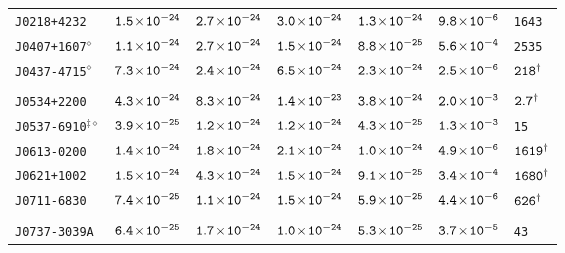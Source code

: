 \begin{longtable}{l | c | c | c | c | c | l}
\scriptsize{\tt{J0218+4232}} & \scriptsize{$\tt{1.5\!\times\!10^{-24}}$} & \scriptsize{$\tt{2.7\!\times\!10^{-24}}$} & \scriptsize{$\tt{3.0\!\times\!10^{-24}}$} &\scriptsize{$\tt{1.3\!\times\!10^{-24}}$} & \scriptsize{$\tt{9.8\!\times\!10^{-6}}$} & \scriptsize{\tt{1643}} \\[-16pt] 
\scriptsize{\tt{J0407+1607}$^{\diamond}$} & \scriptsize{$\tt{1.1\!\times\!10^{-24}}$} &
\scriptsize{$\tt{2.7\!\times\!10^{-24}}$} & \scriptsize{$\tt{1.5\!\times\!10^{-24}}$} &\scriptsize{$\tt{8.8\!\times\!10^{-25}}$} &
\scriptsize{$\tt{5.6\!\times\!10^{-4}}$} & \scriptsize{\tt{2535}} \\[-16pt] 
\scriptsize{\tt{J0437-4715}$^{\diamond}$} & \scriptsize{$\tt{7.3\!\times\!10^{-24}}$} &
\scriptsize{$\tt{2.4\!\times\!10^{-24}}$} & \scriptsize{$\tt{6.5\!\times\!10^{-24}}$} & \scriptsize{$\tt{2.3\!\times\!10^{-24}}$}
& \scriptsize{$\tt{2.5\!\times\!10^{-6}}$} & \scriptsize{$\tt{218^{\dagger}}$} \\[-16pt] 
\\[-20pt] 
\scriptsize{\tt{J0534+2200}} & \scriptsize{$\tt{4.3\!\times\!10^{-24}}$} & \scriptsize{$\tt{8.3\!\times\!10^{-24}}$} & \scriptsize{$\tt{1.4\!\times\!10^{-23}}$} & \scriptsize{$\tt{3.8\!\times\!10^{-24}}$} & \scriptsize{$\tt{2.0\!\times\!10^{-3}}$} & \scriptsize{$\tt{2.7^{\dagger}}$} \\[-16pt] 
\scriptsize{\tt{J0537-6910}$^{\ddagger\diamond}$} & \scriptsize{$\tt{3.9\!\times\!10^{-25}}$} &
\scriptsize{$\tt{1.2\!\times\!10^{-24}}$} & \scriptsize{$\tt{1.2\!\times\!10^{-24}}$} &\scriptsize{$\tt{4.3\!\times\!10^{-25}}$} &
\scriptsize{$\tt{1.3\!\times\!10^{-3}}$} & \scriptsize{\tt{15}} \\[-16pt] 
\scriptsize{\tt{J0613-0200}} & \scriptsize{$\tt{1.4\!\times\!10^{-24}}$} & \scriptsize{$\tt{1.8\!\times\!10^{-24}}$} & \scriptsize{$\tt{2.1\!\times\!10^{-24}}$} & \scriptsize{$\tt{1.0\!\times\!10^{-24}}$} & \scriptsize{$\tt{4.9\!\times\!10^{-6}}$} & \scriptsize{$\tt{1619^{\dagger}}$} \\[-16pt] 
\scriptsize{\tt{J0621+1002}} & \scriptsize{$\tt{1.5\!\times\!10^{-24}}$} & \scriptsize{$\tt{4.3\!\times\!10^{-24}}$} & \scriptsize{$\tt{1.5\!\times\!10^{-24}}$} & \scriptsize{$\tt{9.1\!\times\!10^{-25}}$} & \scriptsize{$\tt{3.4\!\times\!10^{-4}}$} & \scriptsize{$\tt{1680^{\dagger}}$} \\[-16pt] 
\scriptsize{\tt{J0711-6830}} & \scriptsize{$\tt{7.4\!\times\!10^{-25}}$} & \scriptsize{$\tt{1.1\!\times\!10^{-24}}$} & \scriptsize{$\tt{1.5\!\times\!10^{-24}}$} & \scriptsize{$\tt{5.9\!\times\!10^{-25}}$} & \scriptsize{$\tt{4.4\!\times\!10^{-6}}$} & \scriptsize{$\tt{626^{\dagger}}$} \\[-16pt] 
\\[-20pt] 
\scriptsize{\tt{J0737-3039A}} & \scriptsize{$\tt{6.4\!\times\!10^{-25}}$} & \scriptsize{$\tt{1.7\!\times\!10^{-24}}$} & \scriptsize{$\tt{1.0\!\times\!10^{-24}}$} &\scriptsize{$\tt{5.3\!\times\!10^{-25}}$} & \scriptsize{$\tt{3.7\!\times\!10^{-5}}$} & \scriptsize{\tt{43}} \\[-16pt] 

\end{longtable}

